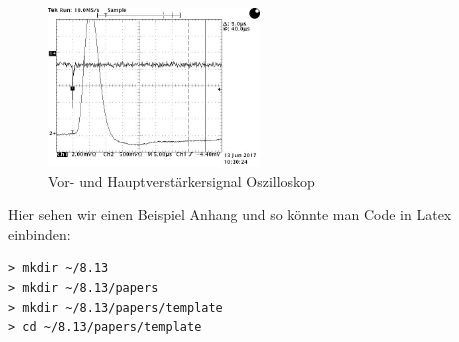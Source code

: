 \documentclass[aps,twocolumn,secnumarabic,nobalancelastpage,amsmath,amssymb,
nofootinbib,superscriptaddress]{revtex4-1}
\begin{document}
\begin{figure}[h]
  \centering
  \includegraphics[width=0.5\textwidth]{../Messung/OsziVerstaerkerkurve/TEK00009.jpg}
  \caption{\label{fig:aufbau} Vor- und Hauptverstärkersignal Oszilloskop}
\end{figure}

Hier sehen wir einen Beispiel Anhang und so könnte man Code in Latex einbinden:
\begin{verbatim}
> mkdir ~/8.13
> mkdir ~/8.13/papers
> mkdir ~/8.13/papers/template
> cd ~/8.13/papers/template
\end{verbatim}


\end{document}
